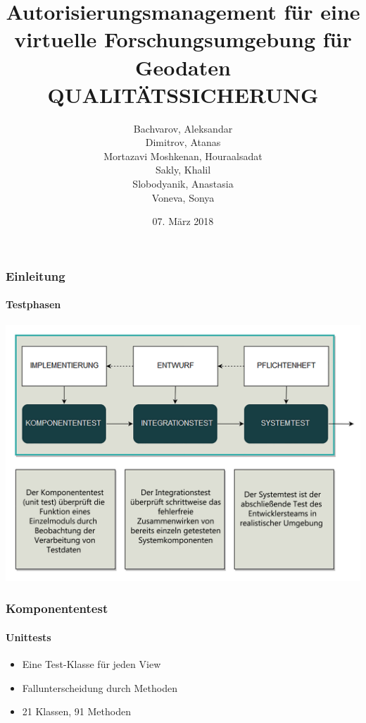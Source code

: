 \documentclass{beamer}
\title[Autorisierungsmanagement für eine virtuelle
Forschungsumgebung für Geodaten: Qualitätssicherung]{Autorisierungsmanagement für eine virtuelle
Forschungsumgebung für Geodaten \\ \textbf{QUALITÄTSSICHERUNG}} %
\author[]{
Bachvarov, Aleksandar\\
Dimitrov, Atanas\\
Mortazavi Moshkenan, Houraalsadat\\
Sakly, Khalil\\
Slobodyanik, Anastasia\\
Voneva, Sonya
} %
\institute[] %
{
Karlsruher Institut für Technologie %

}
\date{07. März 2018} %
\begin{document}
\begin{frame}[plain]
\titlepage %
\end{frame}




\begin{frame}
\frametitle{Einleitung}
\framesubtitle{Testphasen}

\begin{center}
\includegraphics[height=\textheight]{res/testphasen.png}
\end{center}

\end{frame}
\begin{frame}

\frametitle{Komponententest}
\framesubtitle{Unittests}
\begin{itemize}
\item<1-3> Eine Test-Klasse für jeden View
\item<2-3> Fallunterscheidung durch Methoden
\item<3> 21 Klassen, 91 Methoden
\end{itemize}


\end{frame}
\end{document}
